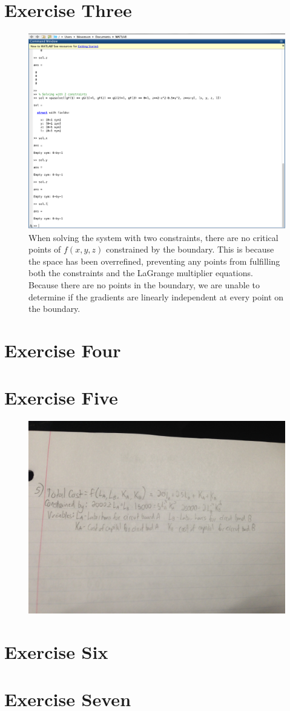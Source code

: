 \documentclass[11pt]{article}
\begin{document}
\section*{Exercise Three}
\begin{figure}[H]
	\centering
	\includegraphics[width=\textwidth]{Prob3.png}
	\caption{When solving the system with two constraints, there are no critical points of $f(x, y, z)$ constrained by the boundary. This is because the space has been overrefined, preventing any points from fulfilling both the constraints and the LaGrange multiplier equations. Because there are no points in the boundary, we are unable to determine if the gradients are linearly independent at every point on the boundary.}
\end{figure}

\section*{Exercise Four}
\section*{Exercise Five}
\begin{figure}[H]
	\centering
	\includegraphics[width=\textwidth]{Five.JPG}
\end{figure}

\section*{Exercise Six}
\section*{Exercise Seven}
\end{document}
